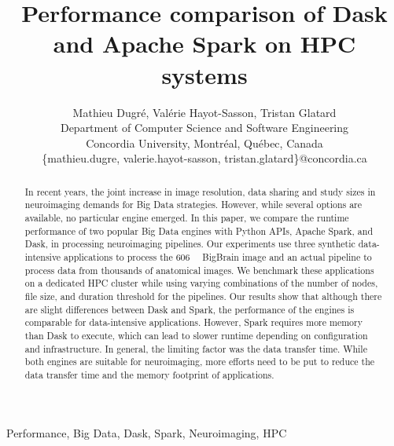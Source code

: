 \documentclass[conference]{IEEEtran}
\begin{document}
\title{Performance comparison of Dask and Apache Spark on HPC systems}

\author{Mathieu Dugr\'e, Val\'erie Hayot-Sasson, Tristan Glatard\\
	Department of Computer Science and Software Engineering\\
	Concordia University, Montr\'eal, Qu\'ebec, Canada\\
	\{mathieu.dugre, valerie.hayot-sasson, tristan.glatard\}@concordia.ca
	\vspace*{0.8cm} %
}

\maketitle

\begin{abstract}
	In recent years, the joint increase in image resolution, data sharing and
	study sizes in neuroimaging demands for Big Data strategies.
	However, while several options are available, no particular engine emerged.
	In this paper, we compare the runtime performance of two popular Big Data engines with
	Python APIs, Apache Spark, and Dask, in processing neuroimaging pipelines.
	Our experiments use three synthetic data-intensive applications to process
	the \SI{606}{\gibi\byte} BigBrain image and an actual pipeline to process data
	from thousands of anatomical images.
	We benchmark these applications on a dedicated HPC cluster while using varying
	combinations of the number of nodes, file size, and duration threshold for the pipelines.
	Our results show that although there are slight differences between Dask and Spark,
	the performance of the engines is comparable for data-intensive applications.
	However, Spark requires more memory than Dask to execute, which can lead to 
	slower runtime depending on configuration and infrastructure.
	In general, the limiting factor was the data transfer time.
	While both engines are suitable for neuroimaging, more efforts need to be put
	to reduce the data transfer time and the memory footprint of applications.
						
\end{abstract}

\begin{IEEEkeywords}
	Performance, Big Data, Dask, Spark, Neuroimaging, HPC
\end{IEEEkeywords}
\end{document}
